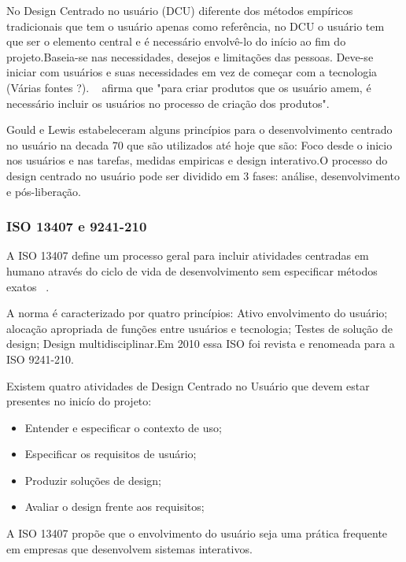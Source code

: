 No Design Centrado no usuário (DCU) diferente dos métodos empíricos tradicionais que tem o usuário apenas como  referência, no DCU o usuário tem que ser o elemento central e é necessário envolvê-lo do início ao fim do projeto.Baseia-se nas necessidades, desejos e limitações das pessoas. Deve-se iniciar com usuários e suas necessidades em vez de começar com a tecnologia (Várias fontes ?). ~ afirma que "para criar produtos que os usuário amem, é necessário incluir os usuários no processo de criação dos produtos". 

Gould e Lewis estabeleceram alguns princípios para o desenvolvimento centrado no usuário na decada 70 que são utilizados até hoje que são: Foco desde o inicio nos usuários e nas tarefas, medidas empiricas e design interativo.O processo do design centrado no usuário pode ser dividido em 3 fases: análise, desenvolvimento e pós-liberação. 


\subsubsection{ISO 13407 e 9241-210}
	
A ISO 13407 define um processo geral para incluir atividades centradas em humano através do ciclo de vida de desenvolvimento sem especificar métodos exatos ~\cite{santos2012}.

A norma é caracterizado por quatro princípios: Ativo envolvimento do usuário; alocação apropriada de funções entre usuários e tecnologia; Testes de solução de design; Design multidisciplinar.Em 2010 essa ISO foi revista e renomeada para a ISO 9241-210.

Existem quatro atividades de Design Centrado no Usuário que devem estar presentes no inicío do projeto:

\begin{itemize}
\item Entender e especificar o contexto de uso;
\item Especificar os requisitos de usuário;
\item Produzir soluções de design;
\item Avaliar o design frente aos requisitos;
\end{itemize}

A ISO 13407 propõe que o envolvimento do usuário seja uma prática frequente em empresas que desenvolvem sistemas interativos.


